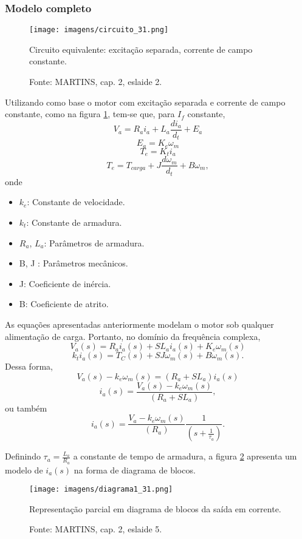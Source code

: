 \subsubsection{Modelo completo}

\begin{figure}[ht!]
\center
\texttt{[image: imagens/circuito\_31.png]}
\caption{\label{fig:C31}Circuito equivalente: excitação separada, corrente de campo constante.}
\caption*{Fonte: MARTINS, cap. 2, eslaide 2.}
\end{figure}

Utilizando como base o motor com excitação separada e corrente de campo constante, como na figura \ref{fig:C31}, tem-se que, para $I_{f}$ constante,
\[V_{a} = R_{a}i_{a} + L_{a}\frac{d i_{a}}{d_{t}} + E_{a}\]
\[E_{a} = K_{e}\omega_{m}\]
\[T_{e} = K_{t}i_{a}\]
\[T_{e} = T_{carga} + J\frac{d\omega_{m}}{d_{t}} + B\omega_{m},\]
onde
\begin{itemize}
   \item $k_{e}$: Constante de velocidade.
   \item $k_{t}$: Constante de armadura.
   \item $R_{a}$, $L_{a}$: Parâmetros de armadura.
   \item B, J : Parâmetros mecânicos.
   \item J: Coeficiente de inércia.
   \item B: Coeficiente de atrito.
\end{itemize}

As equações apresentadas anteriormente modelam o motor sob qualquer alimentação de carga. Portanto, no domínio da frequência complexa,
\[V_{a}(s) = R_{a}i_{a}(s) + SL_{a}i_{a}(s) + K_{e}\omega_{m}(s)\]
\[k_{t}i_{a}(s) = T_{C}(s) + SJ\omega_{m}(s) + B\omega_{m}(s).\]
Dessa forma,
\[V_{a}(s) - k_{e}\omega_{m}(s) = (R_{a} + SL_{a})i_{a}(s)\]
\[i_{a}(s) = \frac{V_{a}(s) - k_{e}\omega_{m}(s)}{(R_{a} + SL_{a})},\]
ou também
 \[i_{a}(s) = \frac{V_{a} - k_{e}\omega_{m}(s)}{(R_{a})}\frac{1}{\left(  s + \frac{1}{\tau_{a}}\right)}.\]
 
Definindo $\tau_{a} = \frac{L_{a}}{R_{a}}$ a constante de tempo de armadura, a figura \ref{fig:D1_31} apresenta um modelo de $i_{a}(s)$ na forma de diagrama de blocos.  
 
\begin{figure}[ht!]
\center
\texttt{[image: imagens/diagrama1\_31.png]}
\caption{\label{fig:D1_31}Representação parcial em diagrama de blocos da saída em corrente.}
\caption*{Fonte: MARTINS, cap. 2, eslaide 5.}
\end{figure}

